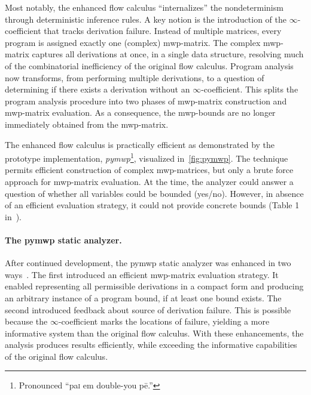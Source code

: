 Most notably, the enhanced flow calculus \enquote{internalizes}
the nondeterminism through deterministic inference rules.
A key notion is the introduction of the \(\infty\)-coefficient that tracks derivation failure.
Instead of multiple matrices, every program is assigned exactly one (complex) mwp-matrix.
The complex mwp-matrix captures all derivations at once, in a single data structure, resolving much of the combinatorial inefficiency of the original flow calculus.
Program analysis now transforms, from performing multiple derivations, to a question of determining if there exists a derivation without an \(\infty\)-coefficient.
This splits the program analysis procedure into two phases of mwp-matrix construction and mwp-matrix evaluation.
As a consequence, the mwp-bounds are no longer immediately obtained from the mwp-matrix.

The enhanced flow calculus is practically efficient as demonstrated by the prototype implementation, \emph{pymwp}\footnote{
    Pronounced \enquote{pa\textsc{i} em double-you p\={e}.}}, visualized in~\autoref{fig:pymwp}.
The technique permits efficient construction of complex mwp-matrices, but only a brute force approach for mwp-matrix evaluation.
At the time, the analyzer could answer a question of whether all variables could be bounded (yes/no).
However, in absence of an efficient evaluation strategy, it could not provide concrete bounds (\cf Table 1 in~).

\paragraph*{The pymwp static analyzer.}
After continued development, the pymwp static analyzer was enhanced in two ways~\cite{aubert2023b}.
The first introduced an efficient mwp-matrix evaluation strategy.
It enabled representing all permissible derivations in a compact form and producing an arbitrary instance of a program bound, if at least one bound exists.
The second introduced feedback about source of derivation failure.
This is possible because the \(\infty\)-coefficient marks the locations of failure, yielding a more informative system than the original flow calculus.
With these enhancements, the analysis produces results efficiently,
while exceeding the informative capabilities of the original flow calculus.

